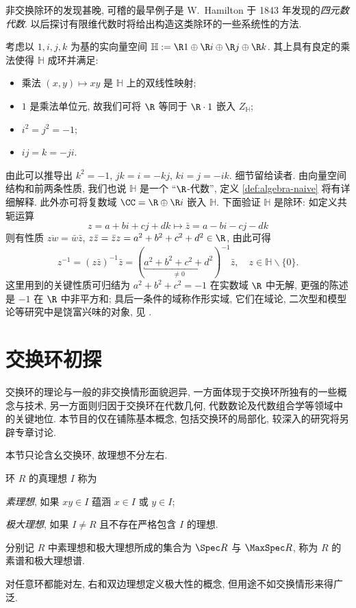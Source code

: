 非交换除环的发现甚晚, 可稽的最早例子是 W.\ Hamilton 于 1843 年发现的\emph{四元数代数}. 以后探讨有限维代数时将给出构造这类除环的一些系统性的方法.
\begin{example}[四元数]\label{eg:Hamilton-quaternion}
	考虑以 $1, i, j, k$ 为基的实向量空间 $\mathbb{H} := \R 1 \oplus \R i \oplus \R j \oplus \R k$. 其上具有良定的乘法使得 $\mathbb{H}$ 成环并满足:
	\begin{itemize}
		\item 乘法 $(x,y) \mapsto xy$ 是 $\mathbb{H}$ 上的双线性映射;
		\item $1$ 是乘法单位元, 故我们可将 $\R$ 等同于 $\R \cdot 1$ 嵌入 $Z_{\mathbb{H}}$;
		\item $i^2 = j^2 = -1$;
		\item $ij=k=-ji$.
	\end{itemize}
	由此可以推导出 $k^2 = -1$, $jk=i=-kj$, $ki=j=-ik$. 细节留给读者. 由向量空间结构和前两条性质, 我们也说 $\mathbb{H}$ 是一个 ``$\R$-代数'', 定义 \ref{def:algebra-naive} 将有详细解释. 此外亦可将复数域 $\CC = \R \oplus \R i$ 嵌入 $\mathbb{H}$. 下面验证 $\mathbb{H}$ 是除环: 如定义共轭运算
	\[ z = a + bi + cj + dk \longmapsto \bar{z} = a - bi -cj -dk \]
	则有性质 $\overline{z w} = \bar{w}\bar{z}$, $z\bar{z} = \bar{z}z = a^2 + b^2 + c^2 + d^2 \in \R$, 由此可得
	\[ z^{-1} = (z\bar{z})^{-1} \bar{z} = (\underbracket{a^2 + b^2 + c^2 + d^2}_{\neq 0})^{-1} \bar{z}, \quad z \in \mathbb{H} \smallsetminus \{0\}. \]
	这里用到的关键性质可归结为 $a^2 + b^2 + c^2 = -1$ 在实数域 $\R$ 中无解, 更强的陈述是 $-1$ 在 $\R$ 中非平方和; 具后一条件的域称作形实域, 它们在域论, 二次型和模型论等研究中是饶富兴味的对象, 见 \cite[\S 9.1]{Feng17}. 
\end{example}

\section{交换环初探}\label{sec:comm-ring-intro}
交换环的理论与一般的非交换情形面貌迥异, 一方面体现于交换环所独有的一些概念与技术, 另一方面则归因于交换环在代数几何, 代数数论及代数组合学等领域中的关键地位. 本节目的仅在铺陈基本概念, 包括交换环的局部化, 较深入的研究将另辟专章讨论.

本节只论含幺交换环, 故理想不分左右.

\begin{definition}\label{def:ring-ideal}
	环 $R$ 的真理想 $I$ 称为
	\begin{compactitem}
		\item \emph{素理想}, 如果 $xy \in I$ 蕴涵 $x \in I$ 或 $y \in I$;
		\item \emph{极大理想}, 如果 $I \neq R$ 且不存在严格包含 $I$ 的理想.
	\end{compactitem}
	分别记 $R$ 中素理想和极大理想所成的集合为 $\Spec R$ 与 $\MaxSpec R$, 称为 $R$ 的素谱和极大理想谱. 
\end{definition}
对任意环都能对左, 右和双边理想定义极大性的概念, 但用途不如交换情形来得广泛.

